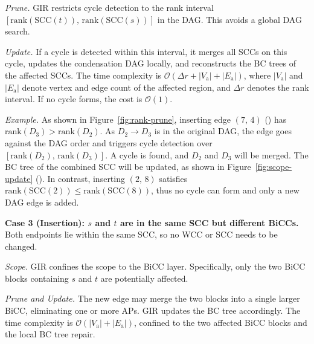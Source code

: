 \textit{Prune.} 
GIR restricts cycle detection to the rank interval $[\mathrm{rank}(\mathrm{SCC}(t)),\,\mathrm{rank}(\mathrm{SCC}(s))]$ in the  DAG.
This avoids a global DAG search.

\textit{Update.} If a cycle is detected within this interval, it merges all SCCs on this cycle, updates the condensation DAG locally, and reconstructs the BC trees of the affected SCCs. The time complexity is $\mathcal{O}(\Delta r + |V_{\mathrm{a}}| + |E_{\mathrm{a}}|)$, where $|V_{\mathrm{a}}|$ and $|E_{\mathrm{a}}|$ denote vertex and edge count of  the affected region, and $\Delta r$ denotes the rank interval.
If no cycle forms, the cost is $\mathcal{O}(1)$. 


\textit{Example.}
As shown in Figure~\ref{fig:rank-prune}, inserting edge $(7,\,4)$ () has $\mathrm{rank}(D_3) > \mathrm{rank}(D_2)$. As $D_2 \to D_3$ is in the original DAG, the edge goes against the DAG order and triggers cycle detection over $[\mathrm{rank}(D_2),\,\mathrm{rank}(D_3)]$.
A cycle is found, and $D_2$ and $D_3$ will be merged.
The BC tree of the combined SCC will be updated, as shown in Figure~\ref{fig:scope-update} ().
In contrast, inserting $(2,\,8)$ satisfies $\mathrm{rank}(\mathrm{SCC}(2)) \le \mathrm{rank}(\mathrm{SCC}(8))$, thus no cycle can form and only a new DAG edge is added.



\textbf{Case 3 (Insertion): $s$ and $t$ are in the same SCC but different BiCCs.}
Both endpoints lie within the same SCC, so no WCC or SCC needs to be changed.

\textit{Scope.} GIR confines the scope to the BiCC layer. Specifically, only the two BiCC blocks containing $s$ and $t$ are potentially affected.

\textit{Prune and Update.} The new edge may merge the two blocks into a single larger BiCC, eliminating one or more APs.
GIR updates the BC tree accordingly.
The time complexity is $\mathcal{O}(|V_{\mathrm{a}}| + |E_{\mathrm{a}}|)$, confined to the two affected BiCC blocks and the local BC tree repair.

